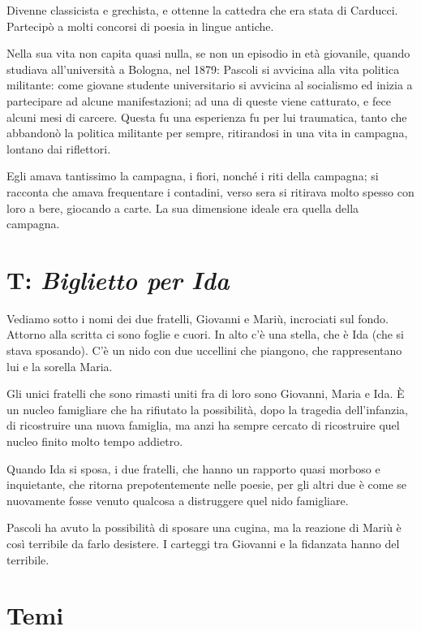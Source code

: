Divenne classicista e grechista, e ottenne la cattedra che era stata di Carducci. Partecipò a molti concorsi di poesia in lingue antiche.

Nella sua vita non capita quasi nulla, se non un episodio in età giovanile, quando studiava all'università a Bologna, nel 1879: Pascoli si avvicina alla vita politica militante: come giovane studente universitario si avvicina al socialismo ed inizia a partecipare ad alcune manifestazioni; ad una di queste viene catturato, e fece alcuni mesi di carcere. Questa fu una esperienza fu per lui traumatica, tanto che abbandonò la politica militante per sempre, ritirandosi in una vita in campagna, lontano dai riflettori.

Egli amava tantissimo la campagna, i fiori, nonché i riti della campagna; si racconta che amava frequentare i contadini, verso sera si ritirava molto spesso con loro a bere, giocando a carte. La sua dimensione ideale era quella della campagna.


\section{T: \textit{Biglietto per Ida}}

Vediamo sotto i nomi dei due fratelli, Giovanni e Mariù, incrociati sul fondo.
Attorno alla scritta ci sono foglie e cuori.
In alto c'è una stella, che è Ida (che si stava sposando).
C'è un nido con due uccellini che piangono, che rappresentano lui e la sorella Maria.

Gli unici fratelli che sono rimasti uniti fra di loro sono Giovanni, Maria e Ida.
È un nucleo famigliare che ha rifiutato la possibilità, dopo la tragedia dell'infanzia, di ricostruire una nuova famiglia, ma anzi ha sempre cercato di ricostruire quel nucleo finito molto tempo addietro.

Quando Ida si sposa, i due fratelli, che hanno un rapporto quasi morboso e inquietante, che ritorna prepotentemente nelle poesie, per gli altri due è come se nuovamente fosse venuto qualcosa a distruggere quel nido famigliare.

Pascoli ha avuto la possibilità di sposare una cugina, ma la reazione di Mariù è così terribile da farlo desistere. I carteggi tra Giovanni e la fidanzata hanno del terribile.

\section{Temi}

